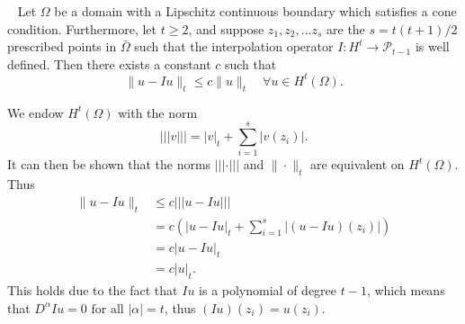 
\begin{lem}{\quad~\label{lem:6.2}}
Let $\Omega$ be a domain with a Lipschitz continuous boundary which satisfies a cone condition. Furthermore, let $t\geq 2$, and suppose $z_1,z_2,\ldots z_s$ are the
$s = t(t+1)/2$ prescribed points in $\bar{\Omega}$ such that the interpolation operator $I:H^t \rightarrow \mathcal{P}_{t-1}$ is well defined.
Then there exists a constant $c$ such that
\begin{equation}
    \|u-Iu\|_t\leq c\|u\|_t\quad \forall u\in H^t(\Omega).
    \label{eq:lem_6.2}
\end{equation}
\end{lem}

\begin{bev}
    We endow $H^t(\Omega)$ with the norm 
    \begin{equation*}
        |||v||| = |v|_t + \sum_{i=1}^s |v(z_i)|.
    \end{equation*}
It can then be shown that the norms $|||\cdot|||$ and $\|\cdot\|_t$ are equivalent on $H^t(\Omega)$. Thus
\begin{align*}
    \|u-Iu\|_t&\leq c|||u-Iu|||\\
    &= c(|u-Iu|_t + \sum_{i=1}^s|(u-Iu)(z_i)|)\\
    &= c|u-Iu|_t \\
    &= c|u|_t.
\end{align*}
This holds due to the fact that $Iu$ is a polynomial of degree $t-1$, which means that $D^{\alpha} Iu = 0 \text{ for all } |\alpha|=t$, thus $(Iu)(z_i)=u(z_i)$.


\end{bev}
